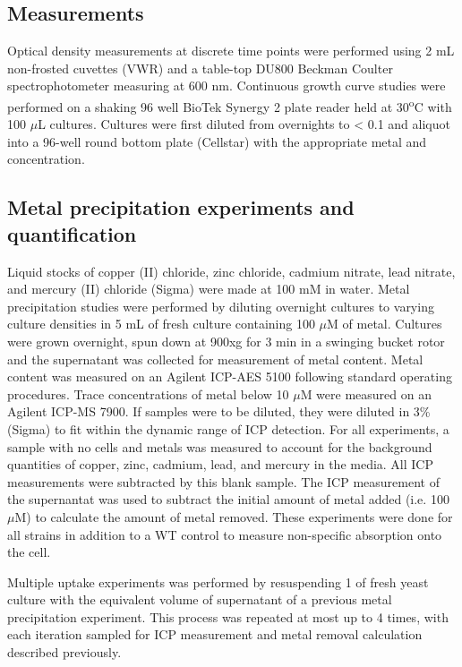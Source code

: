 \documentclass[../main/main]{subfiles}
\begin{document}
\subsection*{\OD{} Measurements}
Optical density measurements at discrete time points were performed using 2 mL non-frosted cuvettes (VWR) and a table-top DU800 Beckman Coulter spectrophotometer measuring at 600 nm. Continuous growth curve studies were performed on a shaking 96 well BioTek Synergy 2 plate reader held at 30\textsuperscript{o}C with 100 $\mu$L cultures. Cultures were first diluted from overnights to < 0.1 \OD{} and aliquot into a 96-well round bottom plate (Cellstar) with the appropriate metal and concentration.

\subsection*{Metal precipitation experiments and quantification}
Liquid stocks of copper (II) chloride, zinc chloride, cadmium nitrate, lead nitrate, and mercury (II) chloride (Sigma) were made at 100 mM in water. Metal precipitation studies were performed by diluting overnight cultures to varying culture densities in 5 mL of fresh culture containing 100 $\mu$M of metal. Cultures were grown overnight, spun down at 900xg for 3 min in a swinging bucket rotor and the supernatant was collected for measurement of metal content. Metal content was measured on an Agilent ICP-AES 5100 following standard operating procedures. Trace concentrations of metal below 10 $\mu$M were measured on an Agilent ICP-MS 7900. If samples were to be diluted, they were diluted in 3\%  (Sigma) to fit within the dynamic range of ICP detection. For all experiments, a sample with no cells and metals was measured to account for the background quantities of copper, zinc, cadmium, lead, and mercury in the media. All ICP measurements were subtracted by this blank sample. The ICP measurement of the supernantat was used to subtract the initial amount of metal added (i.e. 100 $\mu$M) to calculate the amount of metal removed.
These experiments were done for all strains in addition to a WT control to measure non-specific absorption onto the cell.

Multiple uptake experiments was performed by resuspending 1 \OD{} of fresh yeast culture with the equivalent volume of supernatant of a previous metal precipitation experiment. This process was repeated at most up to 4 times, with each iteration sampled for ICP measurement and metal removal calculation described previously.
\end{document}
